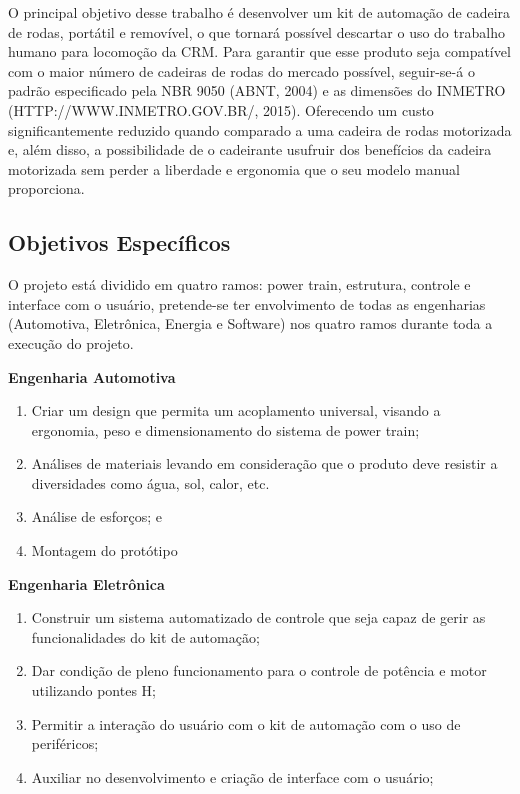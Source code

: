 O principal objetivo desse trabalho é desenvolver um kit de automação de cadeira de rodas, portátil e removível, o que tornará possível descartar o uso do trabalho humano para locomoção da CRM. Para garantir que esse produto seja compatível com o maior número de cadeiras de rodas do mercado possível, seguir-se-á o padrão especificado pela NBR 9050 (ABNT, 2004) e as dimensões do INMETRO (HTTP://WWW.INMETRO.GOV.BR/, 2015). Oferecendo um custo significantemente reduzido quando comparado a uma cadeira de rodas motorizada e, além disso, a possibilidade de o cadeirante usufruir dos benefícios da cadeira motorizada sem perder a liberdade e ergonomia que o seu modelo manual proporciona.

\subsection{Objetivos Específicos}

O projeto está dividido em quatro ramos: power train, estrutura, controle e interface com o usuário, pretende-se ter envolvimento de todas as engenharias (Automotiva, Eletrônica, Energia e Software) nos quatro ramos durante toda a execução do projeto.

\textbf{Engenharia Automotiva}

  \begin{enumerate}
    \item Criar um design que permita um acoplamento universal, visando a ergonomia, peso e dimensionamento do sistema de power train;
    \item Análises de materiais levando em consideração que o produto deve resistir a diversidades como água, sol, calor, etc.
    \item Análise de esforços; e
    \item Montagem do protótipo
  \end{enumerate}

\textbf{Engenharia Eletrônica}
  \begin{enumerate}
    \item Construir um sistema automatizado de controle que seja capaz de gerir as funcionalidades do kit de automação;
    \item Dar condição de pleno funcionamento para o controle de potência e motor utilizando pontes H;
    \item Permitir a interação do usuário com o kit de automação com o uso de periféricos;
    \item Auxiliar no desenvolvimento e criação de interface com o usuário;
  \end{enumerate}

